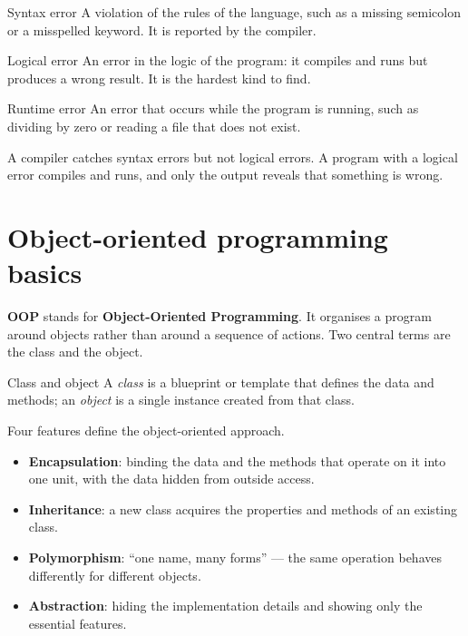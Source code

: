 \begin{definitionbox}{Syntax error}
A violation of the rules of the language, such as a missing semicolon or a
misspelled keyword. It is reported by the compiler.
\end{definitionbox}

\begin{definitionbox}{Logical error}
An error in the logic of the program: it compiles and runs but produces a
wrong result. It is the hardest kind to find.
\end{definitionbox}

\begin{definitionbox}{Runtime error}
An error that occurs while the program is running, such as dividing by zero
or reading a file that does not exist.
\end{definitionbox}

A compiler catches syntax errors but not logical errors. A program with a
logical error compiles and runs, and only the output reveals that something
is wrong.

\section{Object-oriented programming basics}
\textbf{OOP} stands for \textbf{Object-Oriented Programming}. It organises a
program around objects rather than around a sequence of actions. Two central
terms are the class and the object.

\begin{definitionbox}{Class and object}
A \emph{class} is a blueprint or template that defines the data and methods;
an \emph{object} is a single instance created from that class.
\end{definitionbox}

Four features define the object-oriented approach.

\begin{itemize}
  \item \textbf{Encapsulation}: binding the data and the methods that operate
    on it into one unit, with the data hidden from outside access.
  \item \textbf{Inheritance}: a new class acquires the properties and methods
    of an existing class.
  \item \textbf{Polymorphism}: ``one name, many forms'' --- the same operation
    behaves differently for different objects.
  \item \textbf{Abstraction}: hiding the implementation details and showing
    only the essential features.
\end{itemize}

